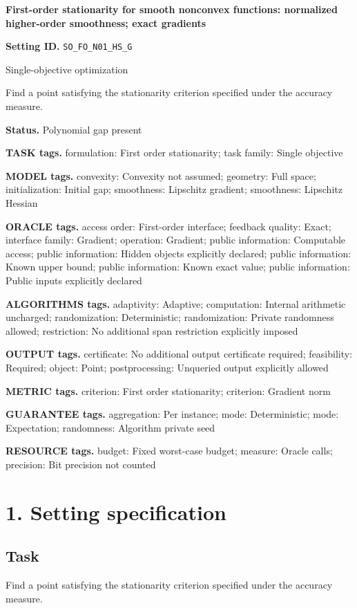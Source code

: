 \documentclass[10pt,a4paper]{article}
\begin{document}
\raggedright

{\LARGE\bfseries\sffamily\color{AtlasNavy} First-order stationarity for smooth nonconvex functions: normalized higher-order smoothness; exact gradients\par}\vspace{5pt}
\textbf{Setting ID.} \texttt{SO\_\allowbreak{}FO\_\allowbreak{}N01\_\allowbreak{}HS\_\allowbreak{}G}

Single-objective optimization

Find a point satisfying the stationarity criterion specified under the accuracy measure.

\textbf{Status.} Polynomial gap present

\textbf{TASK tags.} formulation: First order stationarity; task family: Single objective

\textbf{MODEL tags.} convexity: Convexity not assumed; geometry: Full space; initialization: Initial gap; smoothness: Lipschitz gradient; smoothness: Lipschitz Hessian

\textbf{ORACLE tags.} access order: First-order interface; feedback quality: Exact; interface family: Gradient; operation: Gradient; public information: Computable access; public information: Hidden objects explicitly declared; public information: Known upper bound; public information: Known exact value; public information: Public inputs explicitly declared

\textbf{ALGORITHMS tags.} adaptivity: Adaptive; computation: Internal arithmetic uncharged; randomization: Deterministic; randomization: Private randomness allowed; restriction: No additional span restriction explicitly imposed

\textbf{OUTPUT tags.} certificate: No additional output certificate required; feasibility: Required; object: Point; postprocessing: Unqueried output explicitly allowed

\textbf{METRIC tags.} criterion: First order stationarity; criterion: Gradient norm

\textbf{GUARANTEE tags.} aggregation: Per instance; mode: Deterministic; mode: Expectation; randomness: Algorithm private seed

\textbf{RESOURCE tags.} budget: Fixed worst-case budget; measure: Oracle calls; precision: Bit precision not counted

\section{1. Setting specification}
\subsection{Task}
Find a point satisfying the stationarity criterion specified under the accuracy measure.
\end{document}
